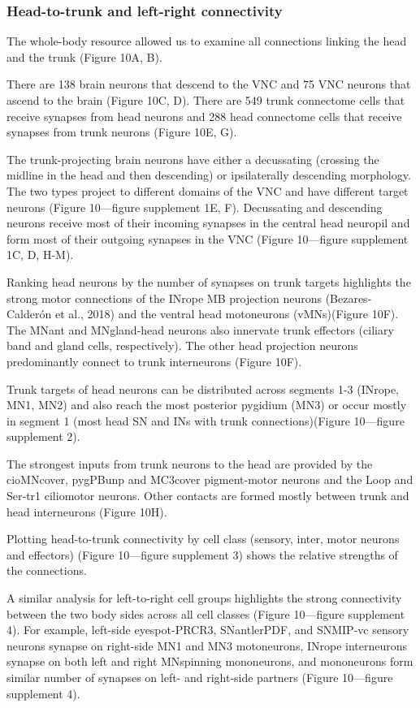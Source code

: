 \documentclass[
  11pt,
]{article}
\begin{document}
\subsubsection{Head-to-trunk and left-right
connectivity}\label{head-to-trunk-and-left-right-connectivity}

The whole-body resource allowed us to examine all connections linking
the head and the trunk (Figure 10A, B).

There are 138 brain neurons that descend to the VNC and 75 VNC neurons
that ascend to the brain (Figure 10C, D). There are 549 trunk connectome
cells that receive synapses from head neurons and 288 head connectome
cells that receive synapses from trunk neurons (Figure 10E, G).

The trunk-projecting brain neurons have either a decussating (crossing
the midline in the head and then descending) or ipsilaterally descending
morphology. The two types project to different domains of the VNC and
have different target neurons (Figure 10---figure supplement 1E, F).
Decussating and descending neurons receive most of their incoming
synapses in the central head neuropil and form most of their outgoing
synapses in the VNC (Figure 10---figure supplement 1C, D, H-M).

Ranking head neurons by the number of synapses on trunk targets
highlights the strong motor connections of the INrope MB projection
neurons (Bezares-Calderón et al., 2018) and the ventral head motoneurons
(vMNs)(Figure 10F). The MNant and MNgland-head neurons also innervate
trunk effectors (ciliary band and gland cells, respectively). The other
head projection neurons predominantly connect to trunk interneurons
(Figure 10F).

Trunk targets of head neurons can be distributed across segments 1-3
(INrope, MN1, MN2) and also reach the most posterior pygidium (MN3) or
occur mostly in segment 1 (most head SN and INs with trunk
connections)(Figure 10---figure supplement 2).

The strongest inputs from trunk neurons to the head are provided by the
cioMNcover, pygPBunp and MC3cover pigment-motor neurons and the Loop and
Ser-tr1 ciliomotor neurons. Other contacts are formed mostly between
trunk and head interneurons (Figure 10H).

Plotting head-to-trunk connectivity by cell class (sensory, inter, motor
neurons and effectors) (Figure 10---figure supplement 3) shows the
relative strengths of the connections.

A similar analysis for left-to-right cell groups highlights the strong
connectivity between the two body sides across all cell classes (Figure
10---figure supplement 4). For example, left-side eyespot-PRCR3,
SNantlerPDF, and SNMIP-vc sensory neurons synapse on right-side MN1 and
MN3 motoneurons, INrope interneurons synapse on both left and right
MNspinning mononeurons, and mononeurons form similar number of synapses
on left- and right-side partners (Figure 10---figure supplement 4).
\end{document}
